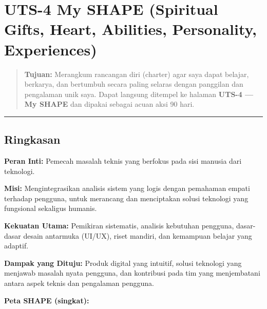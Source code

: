 \documentclass[
  letterpaper,
  DIV=11,
  numbers=noendperiod]{scrreprt}
\begin{document}

\chapter{UTS-4 My SHAPE (Spiritual Gifts, Heart, Abilities, Personality,
Experiences)}\label{uts-4-my-shape-spiritual-gifts-heart-abilities-personality-experiences}

\begin{quote}
\textbf{Tujuan:} Merangkum rancangan diri (charter) agar saya dapat
belajar, berkarya, dan bertumbuh secara paling selaras dengan panggilan
dan pengalaman unik saya. Dapat langsung ditempel ke halaman
\textbf{UTS-4 --- My SHAPE} dan dipakai sebagai acuan aksi 90 hari.
\end{quote}

\begin{center}\rule{0.5\linewidth}{0.5pt}\end{center}

\section{Ringkasan}\label{ringkasan}

\textbf{Peran Inti:} Pemecah masalah teknis yang berfokus pada sisi
manusia dari teknologi.

\textbf{Misi:} Mengintegrasikan analisis sistem yang logis dengan
pemahaman empati terhadap pengguna, untuk merancang dan menciptakan
solusi teknologi yang fungsional sekaligus humanis.

\textbf{Kekuatan Utama:} Pemikiran sistematis, analisis kebutuhan
pengguna, dasar-dasar desain antarmuka (UI/UX), riset mandiri, dan
kemampuan belajar yang adaptif.

\textbf{Dampak yang Dituju:} Produk digital yang intuitif, solusi
teknologi yang menjawab masalah nyata pengguna, dan kontribusi pada tim
yang menjembatani antara aspek teknis dan pengalaman pengguna.

\textbf{Peta SHAPE (singkat):}
\end{document}
